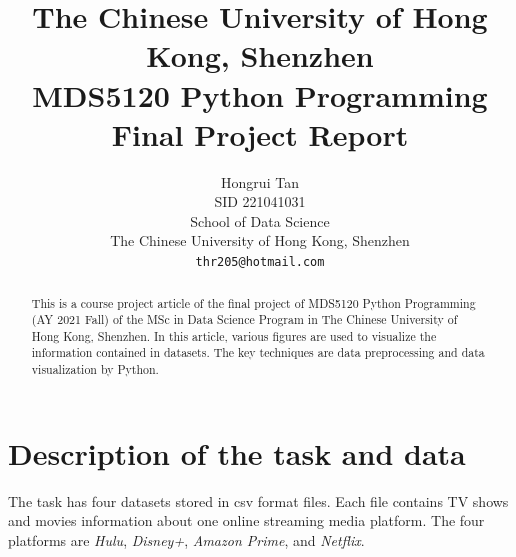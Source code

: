 \documentclass{article}
\begin{document}
\title{
	The Chinese University of Hong Kong, Shenzhen \\
	MDS5120 Python Programming \\
	Final Project Report
}

%

\author{%
	Hongrui Tan\\
	SID 221041031\\
	School of Data Science\\
	The Chinese University of Hong Kong, Shenzhen\\
	\texttt{thr205@hotmail.com} \\
}


	
\maketitle

\begin{abstract}
	This is a course project article of the final project of MDS5120 Python
	Programming (AY 2021 Fall) of the MSc in Data Science Program in The 
	Chinese University of Hong Kong, Shenzhen. In this article, various 
	figures are used to visualize the information contained in datasets. 
	The key techniques are data preprocessing and data visualization by Python.
\end{abstract}

\section{Description of the task and data}

The task has four datasets stored in csv format files. Each file contains 
TV shows and movies information about one online streaming media platform. 
The four platforms are {\it Hulu}, {\it Disney+}, {\it Amazon Prime}, 
and {\it Netflix}.
\end{document}
